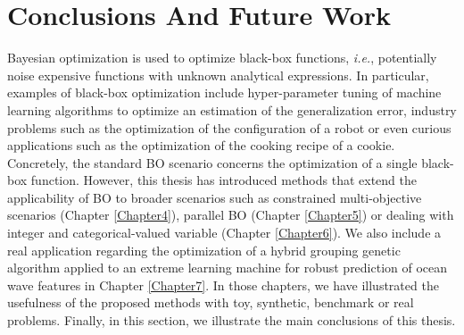 
\chapter{Conclusions And Future Work} %
\label{Chapter8}
Bayesian optimization is used to optimize black-box functions, \textit{i.e.}, potentially noise expensive functions with unknown analytical expressions. In particular, examples of black-box optimization include hyper-parameter tuning of machine learning algorithms to optimize an estimation of the generalization error, industry problems such as the optimization of the configuration of a robot or even curious applications such as the optimization of the cooking recipe of a cookie. Concretely, the standard BO scenario concerns the optimization of a single black-box function. However, this thesis has introduced methods that extend the applicability of BO to broader scenarios such as constrained multi-objective scenarios (Chapter \ref{Chapter4}), parallel BO (Chapter \ref{Chapter5}) or dealing with integer and categorical-valued variable (Chapter \ref{Chapter6}). We also include a real application regarding the optimization of a hybrid grouping genetic algorithm applied to an extreme learning machine for robust prediction of ocean wave features in Chapter \ref{Chapter7}. In those chapters, we have illustrated the usefulness of the proposed methods with toy, synthetic, benchmark or real problems. Finally, in this section, we illustrate the main conclusions of this thesis.

